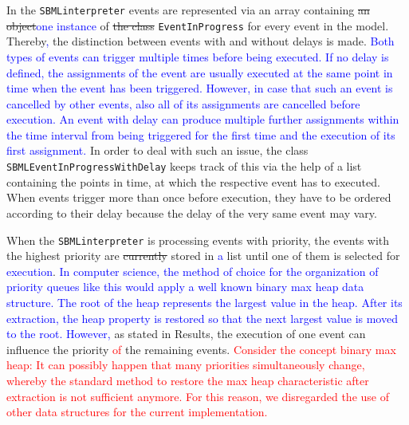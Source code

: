 \documentclass[10pt]{bmc_article}
\newenvironment{bmcformat}{\fussy\setboolean{publ}{true}}{\fussy}
\newcommand{\COR}[1]                      {\textcolor{blue}{#1}}
\newcommand{\EventInProgress}             {\texttt{Event\-In\-Progress}\xspace}
\newcommand{\SBMLEventInProgressWithDelay}{\texttt{SBML\-Event\-In\-Progress\-With\-Delay}\xspace}
\newcommand{\SBMLinterpreter}             {\texttt{SBML\-interpreter}\xspace}
\newcommand{\TODO}[1]                     {\textcolor{red}{#1}}
\begin{document}
\begin{bmcformat}
In the \SBMLinterpreter events are represented via an array containing
\sout{an object}\COR{one instance} of \sout{the class} \EventInProgress for every event in the model.
Thereby\COR{,} the distinction between events with and without delays is made.
\COR{Both types of events can trigger multiple times before being executed.
If no delay is defined, the assignments of the event are usually executed at the same point in time when the event has been triggered.
However, in case that such an event is cancelled by other events, also all of its assignments are cancelled before execution.
An event with delay can produce multiple further assignments within the time interval from being triggered for the first time
and the execution of its first assignment.}
In order to deal with such an issue, the class \SBMLEventInProgressWithDelay
keeps track of this via the help of a list containing the points in time,
at which the respective event has to executed.
When events trigger more than once before execution,
they have to be ordered according to their delay because the delay of the very same event may vary.

When the \SBMLinterpreter is processing events with priority,
the events with the highest priority are \sout{currently} stored in \COR{a} list
until one of them is selected for \COR{execution}.
\COR{In computer science, the method of choice for the organization of priority
queues like this would apply a well known binary max heap data structure.
The root of the heap represents the largest value in the heap.
After its extraction, the heap property is restored so that the next largest
value is moved to the root. However,}
as stated in Results, the execution of one event can influence the priority \TODO{of} the remaining events.
\TODO{Consider the concept binary max heap: It can possibly happen that many priorities simultaneously change,
whereby the standard method to restore the max heap characteristic after extraction is not sufficient anymore.
For this reason, we disregarded the use of other data structures for the current implementation.}


\end{bmcformat}
\end{document}
